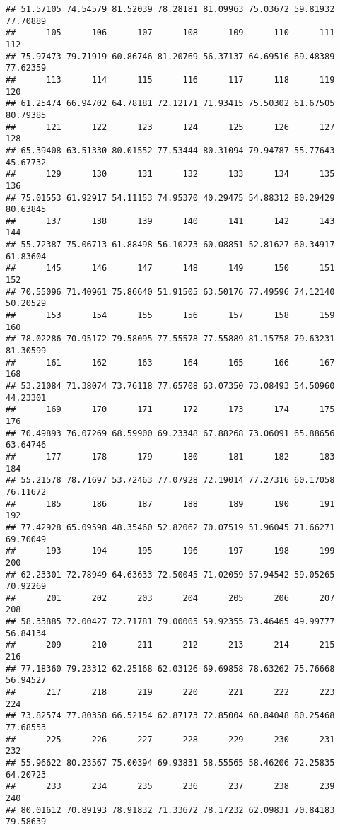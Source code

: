 \documentclass[
]{article}
\begin{document}
\begin{verbatim}
## 51.57105 74.54579 81.52039 78.28181 81.09963 75.03672 59.81932 77.70889 
##      105      106      107      108      109      110      111      112 
## 75.97473 79.71919 60.86746 81.20769 56.37137 64.69516 69.48389 77.62359 
##      113      114      115      116      117      118      119      120 
## 61.25474 66.94702 64.78181 72.12171 71.93415 75.50302 61.67505 80.79385 
##      121      122      123      124      125      126      127      128 
## 65.39408 63.51330 80.01552 77.53444 80.31094 79.94787 55.77643 45.67732 
##      129      130      131      132      133      134      135      136 
## 75.01553 61.92917 54.11153 74.95370 40.29475 54.88312 80.29429 80.63845 
##      137      138      139      140      141      142      143      144 
## 55.72387 75.06713 61.88498 56.10273 60.08851 52.81627 60.34917 61.83604 
##      145      146      147      148      149      150      151      152 
## 70.55096 71.40961 75.86640 51.91505 63.50176 77.49596 74.12140 50.20529 
##      153      154      155      156      157      158      159      160 
## 78.02286 70.95172 79.58095 77.55578 77.55889 81.15758 79.63231 81.30599 
##      161      162      163      164      165      166      167      168 
## 53.21084 71.38074 73.76118 77.65708 63.07350 73.08493 54.50960 44.23301 
##      169      170      171      172      173      174      175      176 
## 70.49893 76.07269 68.59900 69.23348 67.88268 73.06091 65.88656 63.64746 
##      177      178      179      180      181      182      183      184 
## 55.21578 78.71697 53.72463 77.07928 72.19014 77.27316 60.17058 76.11672 
##      185      186      187      188      189      190      191      192 
## 77.42928 65.09598 48.35460 52.82062 70.07519 51.96045 71.66271 69.70049 
##      193      194      195      196      197      198      199      200 
## 62.23301 72.78949 64.63633 72.50045 71.02059 57.94542 59.05265 70.92269 
##      201      202      203      204      205      206      207      208 
## 58.33885 72.00427 72.71781 79.00005 59.92355 73.46465 49.99777 56.84134 
##      209      210      211      212      213      214      215      216 
## 77.18360 79.23312 62.25168 62.03126 69.69858 78.63262 75.76668 56.94527 
##      217      218      219      220      221      222      223      224 
## 73.82574 77.80358 66.52154 62.87173 72.85004 60.84048 80.25468 77.68553 
##      225      226      227      228      229      230      231      232 
## 55.96622 80.23567 75.00394 69.93831 58.55565 58.46206 72.25835 64.20723 
##      233      234      235      236      237      238      239      240 
## 80.01612 70.89193 78.91832 71.33672 78.17232 62.09831 70.84183 79.58639 

\end{verbatim}
\end{document}
